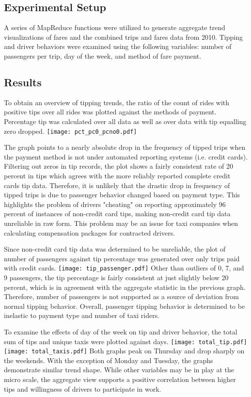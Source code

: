 \documentclass[twoside]{article}
\begin{document}
\begin{multicols}{2}
\subsection{Experimental Setup}
A series of MapReduce functions were utilized to generate aggregate trend visualizations of fares and the combined trips and fares data from 2010. Tipping and driver behaviors were examined using the following variables: number of passengers per trip, day of the week, and method of fare payment.

\subsection{Results}
To obtain an overview of tipping trends, the ratio of the count of rides with positive tips over all rides was plotted against the methods of payment. Percentage tip was calculated over all data as well as over data with tip equalling zero dropped.
\texttt{[image: pct\_pc0\_pcno0.pdf]}

The graph points to a nearly absolute drop in the frequency of tipped trips when the payment method is not under automated reporting systems (i.e. credit cards). Filtering out zeros in tip records, the plot shows a fairly consistent rate of 20 percent in tips which agrees with the more reliably reported complete credit cards tip data. Therefore, it is unlikely that the drastic drop in frequency of tipped trips is due to passenger behavior changed based on payment type. This highlights the problem of drivers "cheating" on reporting approximately 96 percent of instances of non-credit card tips, making non-credit card tip data unreliable in raw form. This problem may be an issue for taxi companies when calculating compensation packages for contracted drivers.

Since non-credit card tip data was determined to be unreliable, the plot of number of passengers against tip percentage was generated over only trips paid with credit cards.
\texttt{[image: tip\_passenger.pdf]}
Other than outliers of 0, 7, and 9 passengers, the tip percentage is fairly consistent at just slightly below 20 percent, which is in agreement with the aggregate statistic in the previous graph. Therefore, number of passengers is not supported as a source of deviation from normal tipping behavior.
Overall, passenger tipping behavior is determined to be inelastic to payment type and number of taxi riders.

To examine the effects of day of the week on tip and driver behavior, the total sum of tips and unique taxis were plotted against days.
\texttt{[image: total\_tip.pdf]}
\texttt{[image: total\_taxis.pdf]}
Both graphs peak on Thursday and drop sharply on the weekends. With the exception of Monday and Tuesday, the graphs demonstrate similar trend shape. While other variables may be in play at the micro scale, the aggregate view supports a positive correlation between higher tips and willingness of drivers to participate in work.


\end{multicols}
\end{document}

